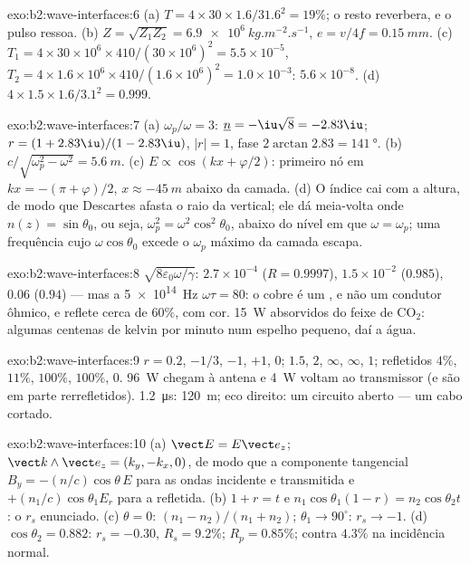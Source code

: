 \begin{solution}{exo:b2:wave-interfaces:6}
(a) $T = 4 \times 30 \times 1.6/31.6^2 = 19\%$; o resto reverbera, e o pulso
ressoa. (b) $Z = \sqrt{Z_1Z_2} = \qty{6.9e6}{kg.m^{-2}.s^{-1}}$, $e = v/4f = \qty{0.15}{mm}$.
(c) $T_1 = 4 \times 30 \times 10^6 \times 410/(30 \times 10^6)^2 = 5.5 \times 10^{-5}$, $T_2 = 4 \times 1.6 \times
10^6 \times 410/(1.6 \times 10^6)^2 = 1.0 \times 10^{-3}$: $5.6 \times 10^{-8}$. (d) $4 \times 1.5 \times 1.6/
3.1^2 = 0.999$.
\end{solution}

\begin{solution}{exo:b2:wave-interfaces:7}
(a) $\omega_p/\omega = 3$: $\underline n = -\iu\sqrt8 = -2.83\iu$; $r = (1 + 2.83\iu)/(1 - 2.83
\iu)$, $|r| = 1$, fase $2\arctan2.83 = \qty{141}{\degree}$. (b) $c/\sqrt{\omega_p^2 - \omega^2}
= \qty{5.6}{m}$. (c) $E \propto \cos(kx + \varphi/2)$: primeiro nó em $kx = -(\pi + \varphi)/2$,
$x \approx \qty{-45}{m}$ abaixo da camada. (d) O índice cai com a altura, de modo que
Descartes afasta o raio da vertical; ele dá meia-volta onde
$n(z) = \sin\theta_0$, ou seja, $\omega_p^2 = \omega^2\cos^2\theta_0$, abaixo do nível em que $\omega = \omega_p$;
uma frequência cujo $\omega\cos\theta_0$ excede o $\omega_p$ máximo da camada
escapa.
\end{solution}

\begin{solution}{exo:b2:wave-interfaces:8}
$\sqrt{8\varepsilon_0\omega/\gamma}$: $2.7 \times 10^{-4}$ ($R = 0.9997$), $1.5 \times 10^{-2}$ ($0.985$),
$0.06$ ($0.94$) --- mas a \qty{5e14}{Hz} $\omega\tau = 80$: o cobre é um ,
e não um condutor ôhmico, e reflete cerca de $60\%$, com cor. \qty{15}{W}
absorvidos do feixe de CO$_2$: algumas centenas de kelvin por minuto num
espelho pequeno, daí a água.
\end{solution}

\begin{solution}{exo:b2:wave-interfaces:9}
$r = 0.2$, $-1/3$, $-1$, $+1$, $0$;  $1.5$, $2$, $\infty$, $\infty$, $1$; refletidos
$4\%$, $11\%$, $100\%$, $100\%$, $0$. \qty{96}{W} chegam à antena e \qty{4}{W}
voltam ao transmissor (e são em parte rerrefletidos). \qty{1.2}{\micro s}:
\qty{120}{m}; eco direito: um circuito aberto --- um cabo cortado.
\end{solution}

\begin{solution}{exo:b2:wave-interfaces:10}
(a) $\vect E = E\vect e_z$; $\vect k\wedge\vect e_z = (k_y, -k_x, 0)$, de modo que a componente
tangencial $B_y = -(n/c)\cos\theta\,E$ para as ondas incidente e transmitida e
$+(n_1/c)\cos\theta_1E_r$ para a refletida. (b) $1 + r = t$ e $n_1\cos\theta_1
(1 - r) = n_2\cos\theta_2t$: o $r_s$ enunciado. (c) $\theta = 0$: $(n_1 - n_2)/(n_1 +
n_2)$; $\theta_1 \to 90^\circ$: $r_s \to -1$. (d) $\cos\theta_2 = 0.882$: $r_s = -0.30$, $R_s =
9.2\%$; $R_p = 0.85\%$; contra $4.3\%$ na incidência normal.
\end{solution}

